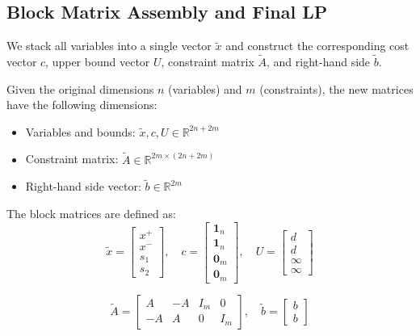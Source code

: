 \documentclass{article}
\begin{document}
\subsection{Block Matrix Assembly and Final LP}
We stack all variables into a single vector $\tilde{x}$ and construct the corresponding cost vector $c$, upper bound vector $U$, constraint matrix $\tilde{A}$, and right-hand side $\tilde{b}$. 

Given the original dimensions $n$ (variables) and $m$ (constraints), the new matrices have the following dimensions:
\begin{itemize}
    \item Variables and bounds: $\tilde{x}, c, U \in \mathbb{R}^{2n + 2m}$
    \item Constraint matrix: $\tilde{A} \in \mathbb{R}^{2m \times (2n + 2m)}$
    \item Right-hand side vector: $\tilde{b} \in \mathbb{R}^{2m}$
\end{itemize}

The block matrices are defined as:
\begin{equation}
    \tilde{x} = \begin{bmatrix} x^+ \\ x^- \\ s_1 \\ s_2 \end{bmatrix}, \quad
    c = \begin{bmatrix} \mathbf{1}_n \\ \mathbf{1}_n \\ \mathbf{0}_m \\ \mathbf{0}_m \end{bmatrix}, \quad
    U = \begin{bmatrix} d \\ d \\ \infty \\ \infty \end{bmatrix}
\end{equation}

\begin{equation}
    \tilde{A} = \begin{bmatrix} A & -A & I_m & 0 \\ -A & A & 0 & I_m \end{bmatrix}, \quad
    \tilde{b} = \begin{bmatrix} b \\ b \end{bmatrix}
\end{equation}
\end{document}
